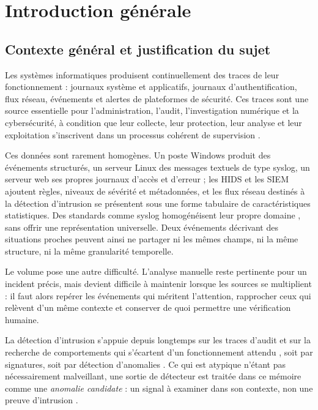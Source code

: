 \chapter*{Introduction générale}



\section*{Contexte général et justification du sujet}


Les systèmes informatiques produisent continuellement des traces de leur fonctionnement : journaux système et applicatifs, journaux d'authentification, flux réseau, événements et alertes de plateformes de sécurité. Ces traces sont une source essentielle pour l'administration, l'audit, l'investigation numérique et la cybersécurité, à condition que leur collecte, leur protection, leur analyse et leur exploitation s'inscrivent dans un processus cohérent de supervision \cite{nist80092}.

Ces données sont rarement homogènes. Un poste Windows produit des événements structurés, un serveur Linux des messages textuels de type syslog, un serveur web ses propres journaux d'accès et d'erreur ; les HIDS et les SIEM ajoutent règles, niveaux de sévérité et métadonnées, et les flux réseau destinés à la détection d'intrusion se présentent sous une forme tabulaire de caractéristiques statistiques. Des standards comme syslog homogénéisent leur propre domaine \cite{rfc5424}, sans offrir une représentation universelle. Deux événements décrivant des situations proches peuvent ainsi ne partager ni les mêmes champs, ni la même structure, ni la même granularité temporelle.

Le volume pose une autre difficulté. L'analyse manuelle reste pertinente pour un incident précis, mais devient difficile à maintenir lorsque les sources se multiplient : il faut alors repérer les événements qui méritent l'attention, rapprocher ceux qui relèvent d'un même contexte et conserver de quoi permettre une vérification humaine.

La détection d'intrusion s'appuie depuis longtemps sur les traces d'audit et sur la recherche de comportements qui s'écartent d'un fonctionnement attendu \cite{denning1987intrusion}, soit par signatures, soit par détection d'anomalies \cite{axelsson2000intrusion}. Ce qui est atypique n'étant pas nécessairement malveillant, une sortie de détecteur est traitée dans ce mémoire comme une \textit{anomalie candidate} : un signal à examiner dans son contexte, non une preuve d'intrusion \cite{chandola2009anomaly}.

